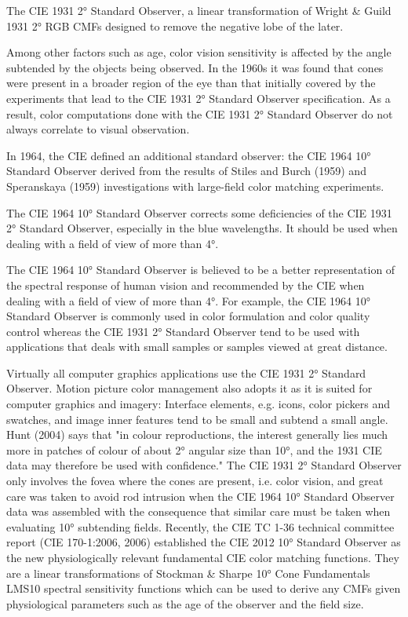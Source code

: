 The CIE 1931 2° Standard Observer, a linear transformation of Wright & Guild 1931 2° RGB CMFs designed to remove the negative lobe of the later.
 
Among other factors such as age, color vision sensitivity is affected by the angle subtended by the objects being observed. In the 1960s it was found that cones were present in a broader region of the eye than that initially covered by the experiments that lead to the CIE 1931 2° Standard Observer specification. As a result, color computations done with the CIE 1931 2° Standard Observer do not always correlate to visual observation.

In 1964, the CIE defined an additional standard observer: the CIE 1964 10° Standard Observer derived from the results of Stiles and Burch (1959) and Speranskaya (1959) investigations with large-field color matching experiments.


The CIE 1964 10° Standard Observer corrects some deficiencies of the CIE 1931 2° Standard Observer, especially in the blue wavelengths. It should be used when dealing with a field of view of more than 4°.

The CIE 1964 10° Standard Observer is believed to be a better representation of the spectral response of human vision and recommended by the CIE when dealing with a field of view of more than 4°. For example, the CIE 1964 10° Standard Observer is commonly used in color formulation and color quality control whereas the CIE 1931 2° Standard Observer tend to be used with applications that deals with small samples or samples viewed at great distance.

Virtually all computer graphics applications use the CIE 1931 2° Standard Observer. Motion picture color management also adopts it as it is suited for computer graphics and imagery:
Interface elements, e.g. icons, color pickers and swatches, and image inner features tend to be small and subtend a small angle. Hunt (2004) says that "in colour reproductions, the interest generally lies much more in patches of colour of about 2° angular size than 10°, and the 1931 CIE data may therefore be used with confidence."
The CIE 1931 2° Standard Observer only involves the fovea where the cones are present, i.e. color vision, and great care was taken to avoid rod intrusion when the CIE 1964 10° Standard Observer data was assembled with the consequence that similar care must be taken when evaluating 10° subtending fields.
Recently, the CIE TC 1-36 technical committee report (CIE 170-1:2006, 2006) established the CIE 2012 10° Standard Observer as the new physiologically relevant fundamental CIE color matching functions. They are a linear transformations of Stockman & Sharpe 10° Cone Fundamentals LMS10 spectral sensitivity functions which can be used to derive any CMFs given physiological parameters such as the age of the observer and the field size.

